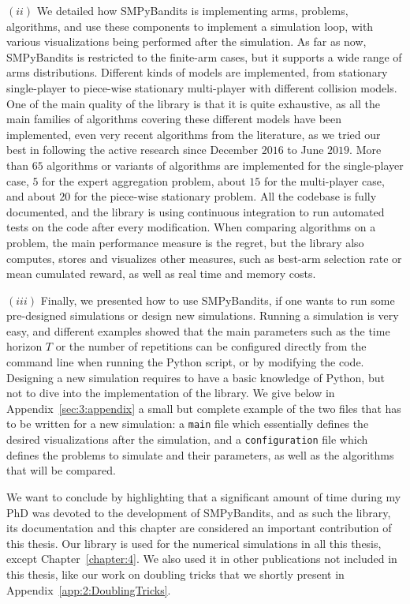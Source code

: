$(ii)$
We detailed how SMPyBandits is implementing arms, problems, algorithms, and use these components to implement a simulation loop, with various visualizations being performed after the simulation.
As far as now, SMPyBandits is restricted to the finite-arm cases, but it supports a wide range of arms distributions.
Different kinds of models are implemented, from stationary single-player to piece-wise stationary multi-player with different collision models.
One of the main quality of the library is that it is quite exhaustive, as all the main families of algorithms covering these different models have been implemented, even very recent algorithms from the literature, as we tried our best in following the active research since December $2016$ to June $2019$.
More than $65$ algorithms or variants of algorithms are implemented for the single-player case, $5$ for the expert aggregation problem, about $15$ for the multi-player case, and about $20$ for the piece-wise stationary problem.
All the codebase is fully documented, and the library is using continuous integration to run automated tests on the code after every modification.
%
When comparing algorithms on a problem, the main performance measure is the regret, but the library also computes, stores and visualizes other measures, such as best-arm selection rate or mean cumulated reward, as well as real time and memory costs.

$(iii)$
Finally, we presented how to use SMPyBandits, if one wants to run some pre-designed simulations or design new simulations.
Running a simulation is very easy, and different examples showed that the main parameters such as the time horizon $T$ or the number of repetitions can be configured directly from the command line when running the Python script, or by modifying the code.
Designing a new simulation requires to have a basic knowledge of Python, but not to dive into the implementation of the library.
We give below in Appendix~\ref{sec:3:appendix} a small but complete example of the two files that has to be written for a new simulation: a \texttt{main} file which essentially defines the desired visualizations after the simulation, and a \texttt{configuration} file which defines the problems to simulate and their parameters, as well as the algorithms that will be compared.


We want to conclude by highlighting that a significant amount of time during my PhD was devoted to the development of SMPyBandits, and as such the library, its documentation and this chapter  are considered an important contribution of this thesis.
%
Our library is used for the numerical simulations in all this thesis, except Chapter~\ref{chapter:4}.
We also used it in other publications not included in this thesis, like our work on doubling tricks \cite{Besson2018DoublingTricks} that we shortly present in Appendix~\ref{app:2:DoublingTricks}.


